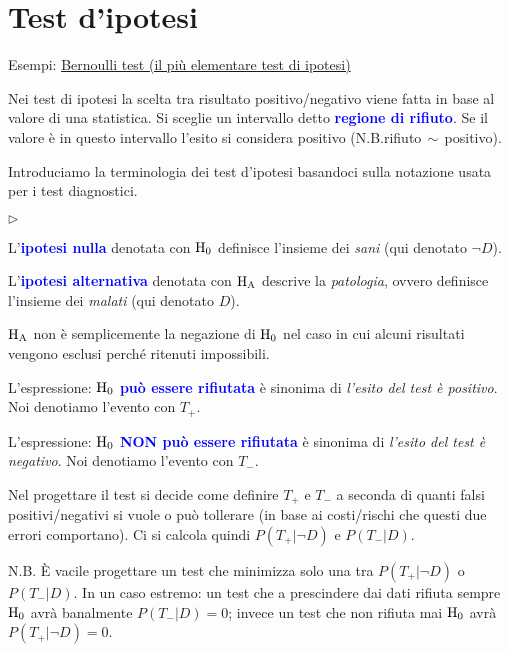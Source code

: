\documentclass[10pt,openany]{book}
\def\H0{{\rm H_0}}
\def\HA{{\rm H_A}}
\newcommand{\mylabel}[1]{{\footnotesize\textsf{#1}}\hfill}
\renewenvironment{itemize}
  {\begin{list}{$\triangleright$}{%
   \setlength{\parskip}{0mm}
   \setlength{\topsep}{.2\baselineskip}
   \setlength{\rightmargin}{0mm}
   \setlength{\listparindent}{0mm}
   \setlength{\itemindent}{0mm}
   \setlength{\labelwidth}{3ex}
   \setlength{\itemsep}{.4\baselineskip}
   \setlength{\parsep}{0mm}
   \setlength{\partopsep}{0mm}
   \setlength{\labelsep}{1ex}
   \setlength{\leftmargin}{\labelwidth+\labelsep}
   \let\makelabel\mylabel}}{%
   \end{list}\vspace*{-1.3mm}}
\def\emph#1{\textcolor{blue}{\textbf{\boldmath #1}}}
\theoremstyle{mio}
\theoremstyle{liscio}
\begin{document}
\clearpage\section{Test d'ipotesi}

Esempi: \hyperref[Bernoulli_test]{Bernoulli test (il più elementare test di ipotesi) \faShare}

Nei test di ipotesi la scelta tra risultato positivo/negativo viene fatta in base al valore di una statistica. Si sceglie un intervallo detto \emph{regione di rifiuto\/}. Se il valore è in questo intervallo l'esito si considera positivo (N.B.\@ rifiuto$\,\sim\,$positivo).

Introduciamo la terminologia dei test d'ipotesi basandoci sulla notazione usata per i test diagnostici.

\begin{itemize}
\item L'\emph{ipotesi nulla\/} denotata con \emph{$\H0$} definisce l'insieme dei \textit{sani\/} (qui denotato $\neg D$). 
\item L'\emph{ipotesi alternativa\/} denotata con \emph{$\HA$}  descrive la \textit{patologia}, ovvero definisce l'insieme dei \textit{malati\/} (qui denotato  $D$).
\item $\HA$ non è semplicemente la negazione di $\H0$ nel caso in cui alcuni risultati vengono esclusi perché ritenuti impossibili.

\item L'espressione: \emph{$\H0$ può essere rifiutata\/} è sinonima di \textit{l'esito del test è positivo}. 
Noi denotiamo l'evento con $T_+$.


\item L'espressione: \emph{$\H0$ NON può essere rifiutata\/} è sinonima di \textit{l'esito del test è negativo}. 
Noi denotiamo l'evento con $T_-$.

\item Nel progettare il test si decide come definire $T_+$ e $T_-$ a seconda di quanti falsi positivi/negativi si vuole o può tollerare (in base ai costi/rischi che questi due errori comportano). Ci si calcola quindi $P(T_+|\neg D)$ e $P(T_-| D)$.
\end{itemize}

N.B. È vacile progettare un test che minimizza solo una tra $P(T_+|\neg D)$ o $P(T_-| D)$. In un caso estremo: un test che a prescindere dai dati rifiuta sempre $\H0$ avrà banalmente $P(T_-| D)=0$; invece un test che non rifiuta mai $\H0$ avrà  $P(T_+|\neg D)=0$.
\end{document}
